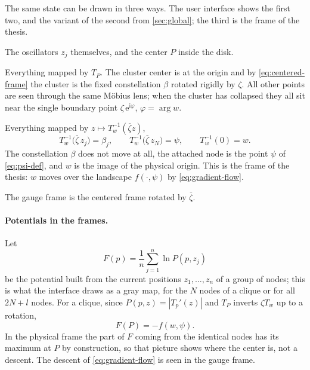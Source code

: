 \documentclass[a4paper,11pt]{article}
\newcommand{\conj}[1]{\overline{#1}}
\newcommand{\T}{T}                       %
\newcommand{\e}{\mathrm{e}}
\newcommand{\ii}{\mathrm{i}}
\theoremstyle{remark}
\begin{document}
The same state can be drawn in three ways. The user interface shows the first
two, and the variant of the second from \cref{sec:global}; the third is the
frame of the thesis.
\begin{description}[leftmargin=1.5em]
\item[Physical frame.] The oscillators $z_j$ themselves, and the center $P$
      inside the disk.
\item[Centered frame.] Everything mapped by $\T_P$. The cluster center is at
      the origin and by \eqref{eq:centered-frame} the cluster is the fixed
      constellation $\beta$ rotated rigidly by $\zeta$. All other points are
      seen through the same M\"obius lens; when the cluster has collapsed they
      all sit near the single boundary point $\zeta\,\e^{\ii\varphi}$,
      $\varphi=\arg w$.
\item[Gauge frame.] Everything mapped by $z\mapsto\T_w^{-1}(\conj\zeta z)$,
      \begin{equation}\label{eq:gauge-frame}
      \T_w^{-1}\bigl(\conj\zeta\,z_j\bigr)=\beta_j,\qquad
      \T_w^{-1}\bigl(\conj\zeta\,z_N\bigr)=\psi,\qquad
      \T_w^{-1}(0)=w .
      \end{equation}
      The constellation $\beta$ does not move at all, the attached node is the
      point $\psi$ of \eqref{eq:psi-def}, and $w$ is the image of the physical
      origin. This is the frame of the thesis: $w$ moves over the landscape
      $f(\cdot,\psi)$ by \eqref{eq:gradient-flow}.
\end{description}
The gauge frame is the centered frame rotated by $\conj\zeta$.

\paragraph{Potentials in the frames.} Let
\begin{equation}\label{eq:physical-potential}
F(p)=\frac1n\sum_{j=1}^{n}\ln P(p,z_j)
\end{equation}
be the potential built from the current positions $z_1,\dots,z_n$ of a group
of nodes; this is what the interface draws as a gray map, for the $N$ nodes of
a clique or for all $2N+l$ nodes. For a clique, since $P(p,z)=|\T_p'(z)|$ and $\T_P$
inverts $\zeta\T_w$ up to a rotation,
\begin{equation}\label{eq:potential-frames}
F(P)=-f(w,\psi).
\end{equation}
In the physical frame the part of $F$ coming from the identical nodes has its
maximum at $P$ by construction, so that picture shows where the center is, not
a descent. The descent of \eqref{eq:gradient-flow} is seen in the gauge frame.
\end{document}
